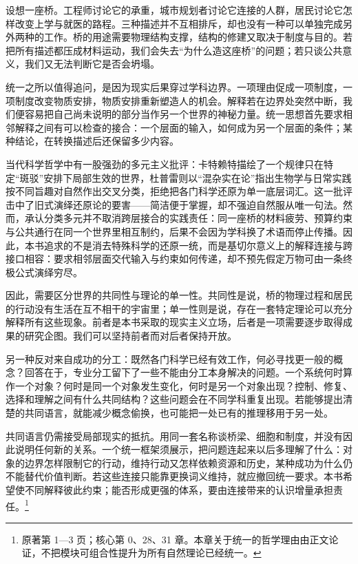 \documentclass[
  11pt,
  oneside]{book}
\begin{document}
设想一座桥。工程师讨论它的承重，城市规划者讨论它连接的人群，居民讨论它怎样改变上学与就医的路程。三种描述并不互相排斥，却也没有一种可以单独完成另外两种的工作。桥的用途需要物理结构支撑，结构的修建又取决于制度与目的。若把所有描述都压成材料运动，我们会失去``为什么造这座桥''的问题；若只谈公共意义，我们又无法判断它是否会坍塌。

统一之所以值得追问，是因为现实后果穿过学科边界。一项理由促成一项制度，一项制度改变物质安排，物质安排重新塑造人的机会。解释若在边界处突然中断，我们便容易把自己尚未说明的部分当作另一个世界的神秘力量。统一思想首先要求相邻解释之间有可以检查的接合：一个层面的输入，如何成为另一个层面的条件；某种结论，在转换描述后还保留多少内容。

当代科学哲学中有一股强劲的多元主义批评：卡特赖特描绘了一个规律只在特定``斑驳''安排下局部生效的世界，杜普雷则以``混杂实在论''指出生物学与日常实践按不同旨趣对自然作出交叉分类，拒绝把各门科学还原为单一底层词汇。这一批评击中了旧式演绎还原论的要害------简洁便于掌握，却不强迫自然服从唯一句法。然而，承认分类多元并不取消跨层接合的实践责任：同一座桥的材料疲劳、预算约束与公共通行在同一个世界里相互制约，后果不会因为学科换了术语而停止传播。因此，本书追求的不是消去特殊科学的还原一统，而是基切尔意义上的解释连接与跨接口相容：要求相邻层面交代输入与约束如何传递，却不预先假定万物可由一条终极公式演绎穷尽。

因此，需要区分世界的共同性与理论的单一性。共同性是说，桥的物理过程和居民的行动没有生活在互不相干的宇宙里；单一性则是说，存在一套特定理论可以充分解释所有这些现象。前者是本书采取的现实主义立场，后者是一项需要逐步取得成果的研究企图。我们可以坚持前者而对后者保持开放。

另一种反对来自成功的分工：既然各门科学已经有效工作，何必寻找更一般的概念？回答在于，专业分工留下了一些不能由分工本身解决的问题。一个系统何时算作一个对象？何时是同一个对象发生变化，何时是另一个对象出现？控制、修复、选择和理解之间有什么共同结构？这些问题会在不同学科重复出现。若能够提出清楚的共同语言，就能减少概念偷换，也可能把一处已有的推理移用于另一处。

\begingroup{}

共同语言仍需接受局部现实的抵抗。用同一套名称谈桥梁、细胞和制度，并没有因此说明任何新的关系。一个统一框架须展示，把问题连起来以后多理解了什么：对象的边界怎样限制它的行动，维持行动又怎样依赖资源和历史，某种成功为什么仍不能替代价值判断。若这些连接只能靠更换词义维持，就应撤回统一要求。本书希望使不同解释彼此约束；能否形成更强的体系，要由连接带来的认识增量承担责任。\footnote{\hypertarget{ph-note-4}{}原著第 1---3 页；核心第 0、28、31 章。本章关于统一的哲学理由由正文论证，不把模块可组合性提升为所有自然理论已经统一。}
\end{document}
